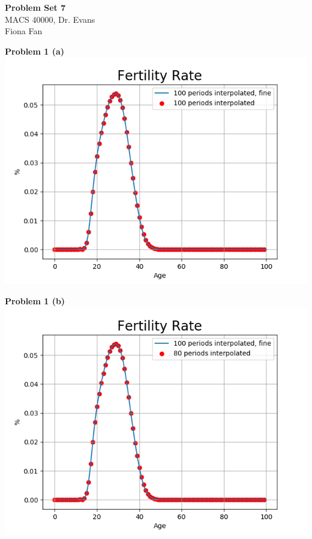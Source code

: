 \documentclass[letterpaper,12pt]{article}
\theoremstyle{definition}
\begin{document}
\begin{flushleft}
  \textbf{\large{Problem Set 7 }} \\
  MACS 40000, Dr. Evans \\
  Fiona Fan
\end{flushleft}

\vspace{5mm}

\noindent\textbf{Problem 1 (a)}\\
\includegraphics[scale=0.5]{images_dem/fert_rate_100.png}


\noindent\textbf{Problem 1 (b)}\\
\includegraphics[scale=0.5]{images_dem/fert_rate_80.png}
\\
\end{document}
